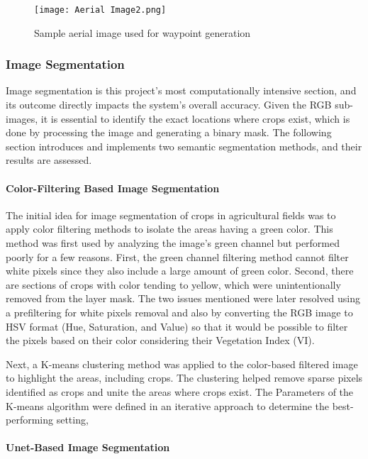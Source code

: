 \documentclass[conference]{IEEEtran}
\begin{document}
	
	\begin{figure}[t]
		\centering
		\texttt{[image: Aerial Image2.png]}
		\caption{Sample aerial image used for waypoint generation
			\cite{b5}}
		\label{fig_Aerial}
	\end{figure}
	
	\subsubsection{Image Segmentation}\label{Image Segmentation}\leavevmode
	
	Image segmentation is this project's most computationally intensive section, and its outcome directly impacts the system's overall accuracy. Given the RGB sub-images, it is essential to identify the exact locations where crops exist, which is done by processing the image and generating a binary mask. The following section introduces and implements two semantic segmentation methods, and their results are assessed.
	
	\paragraph{Color-Filtering Based Image Segmentation}\leavevmode
	
	The initial idea for image segmentation of crops in agricultural fields was to apply color filtering methods to isolate the areas having a green color. This method was first used by analyzing the image's green channel but performed poorly for a few reasons. First, the green channel filtering method cannot filter white pixels since they also include a large amount of green color. Second, there are sections of crops with color tending to yellow, which were unintentionally removed from the layer mask. The two issues mentioned were later resolved using a prefiltering for white pixels removal and also by converting the RGB image to HSV format (Hue, Saturation, and Value) so that it would be possible to filter the pixels based on their color considering their Vegetation Index (VI).
	
	Next, a K-means clustering method was applied to the color-based filtered image to highlight the areas, including crops. The clustering helped remove sparse pixels identified as crops and unite the areas where crops exist. The Parameters of the K-means algorithm were defined in an iterative approach to determine the best-performing setting,
	
	
	\paragraph{Unet-Based Image Segmentation}\leavevmode
	
\end{document}
